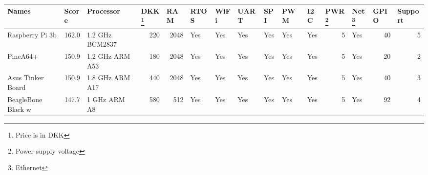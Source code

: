 \begin{table}
  \centering
    \begin{tabular}{lrlrrllllllrlrr}
    \toprule
    \textbf{Names} & \multicolumn{1}{l}{\textbf{Score}} & \textbf{Processor} & \multicolumn{1}{l}{\textbf{DKK\footnote{Price is in DKK}}} & \multicolumn{1}{l}{\textbf{RAM}} & \textbf{RTOS} & \textbf{WiFi} & \textbf{UART} & \textbf{SPI} & \textbf{PWM} & \textbf{I2C} & \multicolumn{1}{l}{\textbf{PWR\footnote{Power supply voltage}}} & \textbf{Net\footnote{Ethernet}} & \multicolumn{1}{l}{\textbf{GPIO}} & \multicolumn{1}{l}{\textbf{Support}} \\
    \midrule
    \rowcolor[rgb]{ .851,  .851,  .851} Raspberry Pi 3b & \cellcolor[rgb]{ .388,  .745,  .482}162.0 & 1.2 GHz BCM2837 & 220   & 2048  & \cellcolor[rgb]{ .573,  .816,  .314}Yes & \cellcolor[rgb]{ .573,  .816,  .314}Yes & \cellcolor[rgb]{ .573,  .816,  .314}Yes & \cellcolor[rgb]{ .573,  .816,  .314}Yes & \cellcolor[rgb]{ .573,  .816,  .314}Yes & \cellcolor[rgb]{ .573,  .816,  .314}Yes & 5     & \cellcolor[rgb]{ .573,  .816,  .314}Yes & 40    & 5 \\
    PineA64+ & \cellcolor[rgb]{ .718,  .843,  .502}150.9 & 1.2 GHz ARM A53 & 180   & 2048  & \cellcolor[rgb]{ .573,  .816,  .314}Yes & \cellcolor[rgb]{ .573,  .816,  .314}Yes & \cellcolor[rgb]{ .573,  .816,  .314}Yes & \cellcolor[rgb]{ .573,  .816,  .314}Yes & \cellcolor[rgb]{ .573,  .816,  .314}Yes & \cellcolor[rgb]{ .573,  .816,  .314}Yes & 5     & \cellcolor[rgb]{ .573,  .816,  .314}Yes & 20    & 2 \\
    \rowcolor[rgb]{ .851,  .851,  .851} Asus Tinker Board & \cellcolor[rgb]{ .718,  .843,  .502}150.9 & 1.8 GHz ARM A17 & 440   & 2048  & \cellcolor[rgb]{ .573,  .816,  .314}Yes & \cellcolor[rgb]{ .573,  .816,  .314}Yes & \cellcolor[rgb]{ .573,  .816,  .314}Yes & \cellcolor[rgb]{ .573,  .816,  .314}Yes & \cellcolor[rgb]{ .573,  .816,  .314}Yes & \cellcolor[rgb]{ .573,  .816,  .314}Yes & 5     & \cellcolor[rgb]{ .573,  .816,  .314}Yes & 40    & 3 \\
    BeagleBone Black w & \cellcolor[rgb]{ .812,  .871,  .51}147.7 & 1 GHz ARM A8 & 580   & 512   & \cellcolor[rgb]{ .573,  .816,  .314}Yes & \cellcolor[rgb]{ .573,  .816,  .314}Yes & \cellcolor[rgb]{ .573,  .816,  .314}Yes & \cellcolor[rgb]{ .573,  .816,  .314}Yes & \cellcolor[rgb]{ .573,  .816,  .314}Yes & \cellcolor[rgb]{ .573,  .816,  .314}Yes & 5     & \cellcolor[rgb]{ .573,  .816,  .314}Yes & 92    & 4 \\

\end{tabular}
\end{table}
